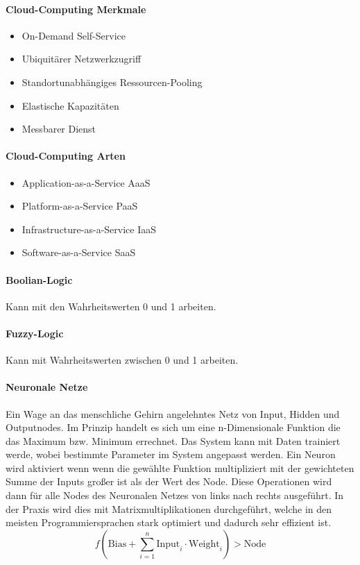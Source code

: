 \documentclass[twocolumn]{article}
\begin{document}
\paragraph{Cloud-Computing Merkmale}
	\begin{itemize}
		\item On-Demand Self-Service
		\item Ubiquitärer Netzwerkzugriff
		\item Standortunabhängiges Ressourcen-Pooling
		\item Elastische Kapazitäten
		\item Messbarer Dienst
	\end{itemize}

\paragraph{Cloud-Computing Arten}
	\begin{itemize}
		\item Application-as-a-Service AaaS
		\item Platform-as-a-Service PaaS
		\item Infrastructure-as-a-Service IaaS
		\item Software-as-a-Service SaaS
	\end{itemize}


\paragraph{Boolian-Logic}
	Kann mit den Wahrheitswerten 0 und 1 arbeiten.

\paragraph{Fuzzy-Logic}
	Kann mit Wahrheitswerten zwischen 0 und 1 arbeiten.

\paragraph{Neuronale Netze}
Ein Wage an das menschliche Gehirn angelehntes Netz von Input, Hidden und Outputnodes. Im Prinzip handelt es sich um eine n-Dimensionale Funktion die das Maximum bzw. Minimum errechnet. Das System kann mit Daten trainiert werde, wobei bestimmte Parameter im System angepasst werden. Ein Neuron wird aktiviert wenn wenn die gewählte Funktion multipliziert mit der gewichteten Summe der Inputs großer ist als der Wert des Node. Diese Operationen wird dann für alle Nodes des Neuronalen Netzes von links nach rechts ausgeführt. In der Praxis wird dies mit Matrixmultiplikationen durchgeführt, welche in den meisten Programmiersprachen stark optimiert und dadurch sehr effizient ist.
\begin{equation*}
f \left(\text{Bias} + \sum_{i=1}^{n} \text{Input}_i \cdot \text{Weight}_i \right) > \text{Node}
	\end{equation*}
	
\end{document}

